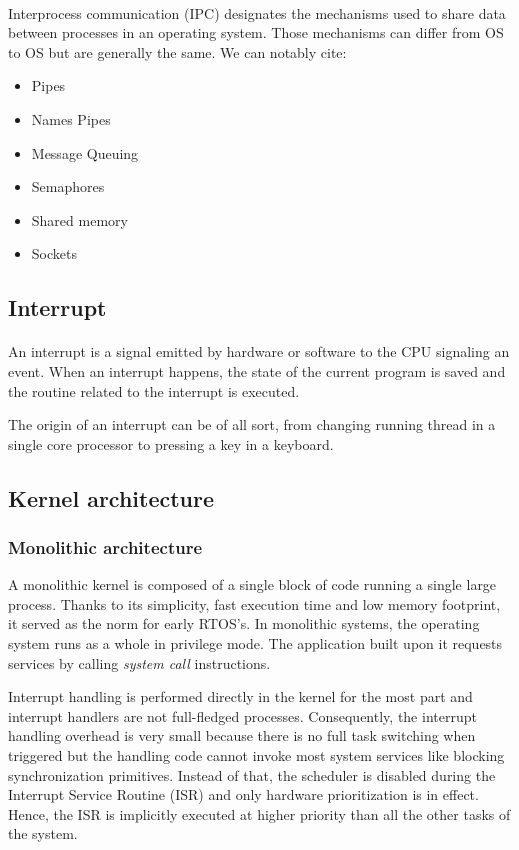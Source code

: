 \paragraph{}
Interprocess communication (IPC) designates the mechanisms used to share data between processes in an operating system.
Those mechanisms can differ from OS to OS but are generally the same.
We can notably cite:
\begin{itemize}
    \item Pipes
    \item Names Pipes
    \item Message Queuing
    \item Semaphores
    \item Shared memory
    \item Sockets
\end{itemize}

\subsection{Interrupt}
\paragraph{}
An interrupt is a signal emitted by hardware or software to the CPU signaling an event.
When an interrupt happens, the state of the current program is saved 
    and the routine related to the interrupt is executed.

The origin of an interrupt can be of all sort, 
    from changing running thread in a single core processor to pressing a key in a keyboard.

\subsection{Kernel architecture}

\subsubsection{Monolithic architecture}
A monolithic kernel is composed of a single block of code running a single large process.
Thanks to its simplicity, fast execution time and low memory footprint, it served as the norm for early RTOS's.
In monolithic systems, the operating system runs as a whole in privilege mode.
The application built upon it requests services by calling \textit{system call} instructions.

Interrupt handling is performed directly in the kernel for the most part and interrupt handlers are not full-fledged processes.
Consequently, the interrupt handling overhead is very small because there is no full task switching when triggered
    but the handling code cannot invoke most system services like blocking synchronization primitives.
Instead of that, the scheduler is disabled during the Interrupt Service Routine (ISR) and only hardware prioritization is in effect.
Hence, the ISR is implicitly executed at higher priority than all the other tasks of the system.

